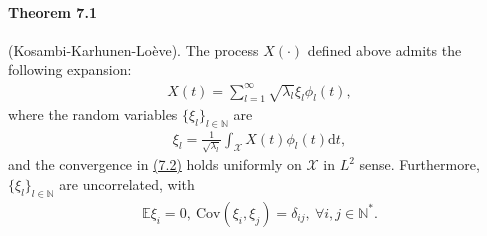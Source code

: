 \documentclass{article}
\begin{document}
\paragraph{Theorem 7.1} (Kosambi-Karhunen-Loève). The process $X(\cdot)$ defined above admits the following expansion:
\begin{align*}
	X(t) = \sum_{l=1}^\infty\sqrt{\lambda_l}\xi_l\phi_l(t),\tag{7.2}\label{eq:7.2}
\end{align*}
where the random variables $\{\xi_l\}_{l\in\mathbb{N}}$ are
\begin{align*}
	\xi_l = \frac{1}{\sqrt{\lambda_l}}\int_{\mathcal{X}} X(t)\phi_l(t)\mathrm{d}t,\tag{7.3}
\end{align*}
and the convergence in \hyperref[eq:7.2]{(7.2)} holds uniformly on $\mathcal{X}$ in $L^2$ sense. Furthermore, $\lbrace\xi_l\rbrace_{l\in\mathbb{N}}$ are uncorrelated, with
\begin{align*}
	\mathbb{E}\xi_i=0,\ \mathrm{Cov}(\xi_i,\xi_{j}) = \delta_{ij},\ \forall i,j\in\mathbb{N}^*.\tag{7.4}
\end{align*}
\end{document}
